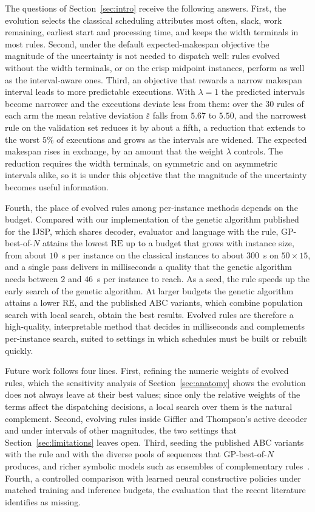 \documentclass[review,authoryear,11pt]{elsarticle}
\newcommand{\RE}{\mathrm{RE}}
\begin{document}
The questions of Section~\ref{sec:intro} receive the following answers.
First, the evolution selects the classical scheduling attributes most
often, slack, work remaining, earliest start and processing time, and
keeps the width terminals in most rules. Second, under the default
expected-makespan objective the magnitude of the uncertainty is not
needed to dispatch well: rules evolved without the width terminals, or
on the crisp midpoint instances, perform as well as the interval-aware
ones. Third, an objective that rewards a narrow makespan interval leads to
more predictable executions. With $\lambda = 1$ the predicted intervals
become narrower and the executions deviate less from them: over the 30
rules of each arm the mean relative deviation $\bar\varepsilon$ falls
from $5.67$ to $5.50$, and the narrowest rule on the validation set
reduces it by about a fifth, a reduction that extends to the worst $5\%$
of executions and grows as the intervals are widened. The expected makespan rises in exchange, by an
amount that the weight $\lambda$ controls. The reduction requires the
width terminals, on symmetric and on asymmetric intervals alike, so it
is under this objective that the magnitude of the uncertainty becomes
useful information.

Fourth, the place of evolved rules among per-instance methods depends on
the budget. Compared with our implementation of the genetic algorithm
published for the IJSP, which shares decoder, evaluator and language
with the rule, GP-best-of-$N$ attains the lowest $\RE$ up to a budget
that grows with instance size, from about $10$~s per instance on the
classical instances to about $300$~s on $50{\times}15$, and a single
pass delivers in milliseconds a quality that the genetic algorithm needs
between $2$ and $46$~s per instance to reach. As a seed, the rule speeds
up the early search of the genetic algorithm. At larger budgets the
genetic algorithm attains a lower $\RE$, and the published ABC variants,
which combine population search with local search, obtain the best
results. Evolved rules are therefore a high-quality, interpretable
method that decides in milliseconds and complements per-instance search,
suited to settings in which schedules must be built or rebuilt quickly.

Future work follows four lines. First, refining the numeric weights of
evolved rules, which the sensitivity analysis of
Section~\ref{sec:anatomy} shows the evolution does not always leave at
their best values; since only the relative weights of the terms affect
the dispatching decisions, a local search over them is the natural
complement.
Second, evolving rules inside Giffler and Thompson's active decoder and
under intervals of other magnitudes, the two settings that
Section~\ref{sec:limitations} leaves open. Third, seeding the published
ABC variants with the rule and with the diverse pools of sequences that
GP-best-of-$N$ produces, and richer symbolic models such as ensembles of
complementary rules~\citep{GilGala2021Ensembles}. Fourth, a controlled
comparison with learned neural constructive policies under matched
training and inference budgets, the evaluation that the recent
literature~\citep{Xu2025} identifies as missing.
\end{document}
